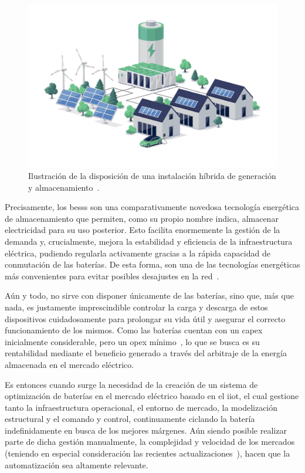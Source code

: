 \begin{figure}
  \centering
  \includegraphics[width=0.5\linewidth]{figures/instalacion-bess.jpg}
  \caption{Ilustración de la disposición de una instalación híbrida de generación y almacenamiento~\cite{deutz2023what}.}
  \label{fig:instalacion-bess}
\end{figure}

Precisamente, los \glspl{bess} son una comparativamente novedosa tecnología energética de almacenamiento que permiten, como su propio nombre indica, almacenar electricidad para su uso posterior. Esto facilita enormemente la gestión de la demanda y, crucialmente, mejora la estabilidad y eficiencia de la infraestructura eléctrica, pudiendo regularla activamente gracias a la rápida capacidad de conmutación de las baterías. De esta forma, son una de las tecnologías energéticas más convenientes para evitar posibles desajustes en la red~\cite{xu2014bess}.

Aún y todo, no sirve con disponer únicamente de las baterías, sino que, más que nada, es justamente imprescindible controlar la carga y descarga de estos dispositivos cuidadosamente para prolongar su vida útil y asegurar el correcto funcionamiento de los mismos. Como las baterías cuentan con un \gls{capex} inicialmente considerable, pero un \gls{opex} mínimo~\cite{larsson2018cost}, lo que se busca es su rentabilidad mediante el beneficio generado a través del arbitraje de la energía almacenada en el mercado eléctrico.

Es entonces cuando surge la necesidad de la creación de un sistema de optimización de baterías en el mercado eléctrico basado en el \gls{iiot}, el cual gestione tanto la infraestructura operacional, el entorno de mercado, la modelización estructural y el comando y control, continuamente ciclando la batería indefinidamente en busca de los mejores márgenes. Aún siendo posible realizar parte de dicha gestión manualmente, la complejidad y velocidad de los mercados (teniendo en especial consideración las recientes actualizaciones~\cite{cnmc2025resolucion, omie2025instruccion}), hacen que la automatización sea altamente relevante.

